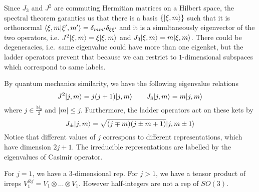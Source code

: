     Since $J_3$ and $J^2$ are commuting Hermitian matrices on a Hilbert space, the spectral theorem garanties us that there is a basis $\{\vert\xi, m\rangle\}$ such that it is orthonormal $\langle\xi,m\vert\xi', m'\rangle = \delta_{mm'} \delta_{\xi\xi'}$ and it is a simultaneously eigenvector of the two operators, i.e. $J^2 \vert\xi,m\rangle = \xi \vert\xi, m\rangle$ and $J_3 \vert\xi,m\rangle = m \vert\xi, m\rangle$. There could be degeneracies, i.e.~same eigenvalue could have more than one eigenket, but the ladder operators prevent that because we can restrict to $1$-dimensional subspaces which correspond to same labels.

    By quantum mechanics similarity, we have the following eigenvalue relations 
    \begin{equation}\label{j3}
        J^2 \vert j ,m\rangle = j (j+1) \vert j, m\rangle \qquad J_3 \vert j, m\rangle = m \vert j, m\rangle
    \end{equation}
    where $j \in \frac{\mathbb N_0}{2}$ and $|m| \leq j$. Furthermore, the ladder operators act on these kets by 
    \begin{equation*}
        J_\pm \vert j, m\rangle = \sqrt{(j \mp m) (j \pm m + 1)} \vert j, m \pm 1\rangle
    \end{equation*}
    Notice that different values of $j$ correspons to different representations, which have dimension $2j + 1$. The irreducible representations are labelled by the eigenvalues of Casimir operator.

    For $j = 1$, we have a $3$-dimensional rep. For $j > 1$, we have a tensor product of irreps $V_1^{\otimes j} = V_1 \otimes \ldots \otimes V_1$. However half-integers are not a rep of $SO(3)$.

